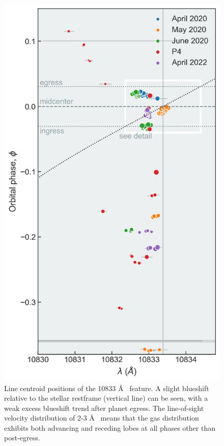 \documentclass[linenumbers, twocolumn, trackchanges]{aastex631}
\begin{document}
\begin{figure}
  \centering
  \includegraphics[width=\linewidth]{centroid_overview10833.png}
  \caption{Line centroid positions of the   10833 \AA~ feature.  A slight blueshift relative to the stellar restframe (vertical line) can be seen, with a weak excess blueshift trend after planet egress. The line-of-sight velocity distribution of 2-3 \AA~ means that the gas distribution exhibits both advancing and receding lobes at all phases other than post-egress.}
  \label{fig:centroids}
\end{figure}
\end{document}
